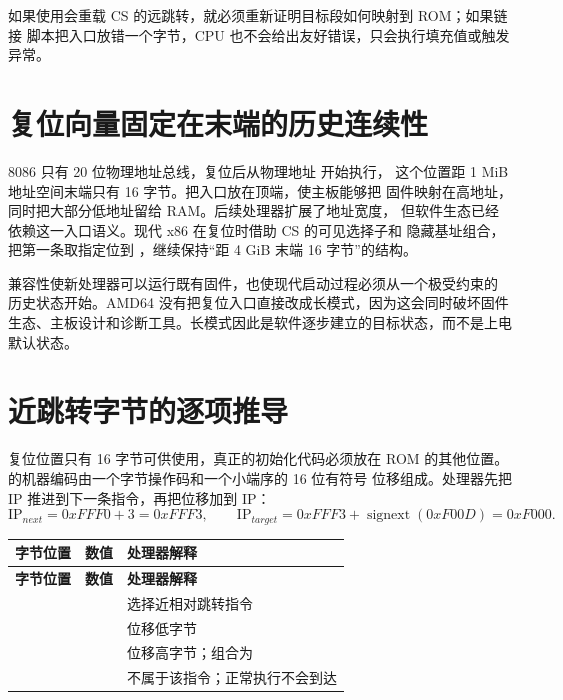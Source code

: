\begin{failurebox}
如果使用会重载 CS 的远跳转，就必须重新证明目标段如何映射到 ROM；如果链接
脚本把入口放错一个字节，CPU 也不会给出友好错误，只会执行填充值或触发异常。
\end{failurebox}

\section{复位向量固定在末端的历史连续性}

8086 只有 20 位物理地址总线，复位后从物理地址  开始执行，
这个位置距 1 MiB 地址空间末端只有 16 字节。把入口放在顶端，使主板能够把
固件映射在高地址，同时把大部分低地址留给 RAM。后续处理器扩展了地址宽度，
但软件生态已经依赖这一入口语义。现代 x86 在复位时借助 CS 的可见选择子和
隐藏基址组合，把第一条取指定位到 ，继续保持“距 4 GiB
末端 16 字节”的结构。

兼容性使新处理器可以运行既有固件，也使现代启动过程必须从一个极受约束的
历史状态开始。AMD64 没有把复位入口直接改成长模式，因为这会同时破坏固件
生态、主板设计和诊断工具。长模式因此是软件逐步建立的目标状态，而不是上电
默认状态。

\section{近跳转字节的逐项推导}

复位位置只有 16 字节可供使用，真正的初始化代码必须放在 ROM 的其他位置。
 的机器编码由一个字节操作码和一个小端序的 16 位有符号
位移组成。处理器先把 IP 推进到下一条指令，再把位移加到 IP：
\[
  \mathrm{IP}_{next}=0xFFF0+3=0xFFF3,
  \qquad
  \mathrm{IP}_{target}=0xFFF3+\operatorname{signext}(0xF00D)=0xF000.
\]

\begin{longtable}{L{0.16\textwidth}L{0.22\textwidth}L{0.48\textwidth}}
\toprule
\textbf{字节位置} & \textbf{数值} & \textbf{处理器解释}\\
\midrule
\endfirsthead
\toprule
\textbf{字节位置} & \textbf{数值} & \textbf{处理器解释}\\
\midrule
\endhead
{} &  & 选择近相对跳转指令\\
 &  & 位移低字节\\
 &  & 位移高字节；组合为 \\
 &  & 不属于该指令；正常执行不会到达\\
\bottomrule
\end{longtable}

